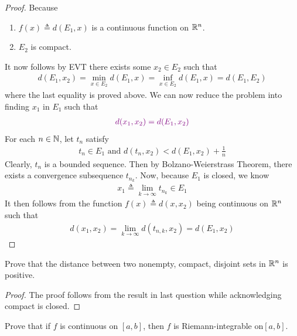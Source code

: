 \documentclass{report}
\begin{document}
\begin{proof}
Because 
\begin{enumerate}[label=(\alph*)]
  \item $f(x)\triangleq d (E_1,x)$ is a continuous function on $\mathbb{R}^n$. 
  \item $E_2$ is compact. 
\end{enumerate}
It now follows by EVT there exists some  $x_2 \in E_2$ such that 
\begin{align*}
d(E_1,x_2)=\min_{x \in E_2} d(E_1,x)=\inf_{x \in E_2}d(E_1,x)=d(E_1,E_2)
\end{align*}
where the last equality is proved above. We can now reduce the problem into finding $x_1$ in $E_1$ such that  
\begin{align*}
  \textcolor{violet}{d(x_1,x_2)=d(E_1,x_2)}
\end{align*}
For each $n\in\mathbb{N}$, let $t_n$ satisfy 
 \begin{align*}
t_n \in E_1\text{ and }d(t_n,x_2)< d(E_1,x_2) + \frac{1}{n}
\end{align*}
Clearly, $t_n$ is a bounded sequence. Then by Bolzano-Weierstrass Theorem, there exists a convergence subsequence $t_{n_k}$. Now, because $E_1$ is closed, we know 
\begin{align*}
x_1\triangleq \lim_{k\to \infty}t_{n_k} \in E_1
\end{align*}
It then follows from the function $f(x)\triangleq d(x,x_2)$ being continuous on $\mathbb{R}^n$ such that 
 \begin{align*}
d(x_1,x_2)=\lim_{k\to \infty}d(t_{n,k},x_2)=d(E_1,x_2)
\end{align*}
\end{proof}
\begin{question}{}{}
Prove that the distance between two nonempty, compact, disjoint sets in $\mathbb{R}^n$ is positive. 
\end{question}
\begin{proof}
The proof follows from the result in last question while acknowledging compact is closed. 
\end{proof}
\begin{question}{}{}
Prove that if $f$ is continuous on $[a,b]$, then $f$ is Riemann-integrable on$[a,b]$. 
\end{question}
\end{document}
